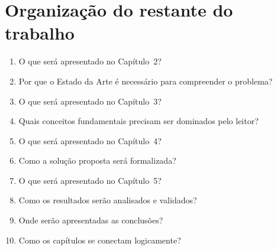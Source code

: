 \section{Organização do restante do trabalho}

\begin{enumerate}
	\item O que será apresentado no Capítulo~2?
	\item Por que o Estado da Arte é necessário para compreender o problema?
	\item O que será apresentado no Capítulo~3?
	\item Quais conceitos fundamentais precisam ser dominados pelo leitor?
	\item O que será apresentado no Capítulo~4?
	\item Como a solução proposta será formalizada?
	\item O que será apresentado no Capítulo~5?
	\item Como os resultados serão analisados e validados?
	\item Onde serão apresentadas as conclusões?
	\item Como os capítulos se conectam logicamente?
\end{enumerate}